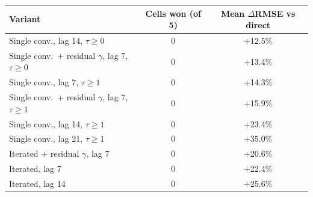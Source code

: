 \begin{tabular}{lcc}
\hline
Variant & Cells won (of 5) & Mean $\Delta$RMSE vs direct \\
\hline
Single conv., lag 14, $\tau{\geq}0$ & 0 & +12.5\% \\
Single conv.\ + residual $\gamma$, lag 7, $\tau{\geq}0$ & 0 & +13.4\% \\
Single conv., lag 7, $\tau{\geq}1$ & 0 & +14.3\% \\
Single conv.\ + residual $\gamma$, lag 7, $\tau{\geq}1$ & 0 & +15.9\% \\
Single conv., lag 14, $\tau{\geq}1$ & 0 & +23.4\% \\
Single conv., lag 21, $\tau{\geq}1$ & 0 & +35.0\% \\
Iterated + residual $\gamma$, lag 7 & 0 & +20.6\% \\
Iterated, lag 7 & 0 & +22.4\% \\
Iterated, lag 14 & 0 & +25.6\% \\
\hline
\end{tabular}
